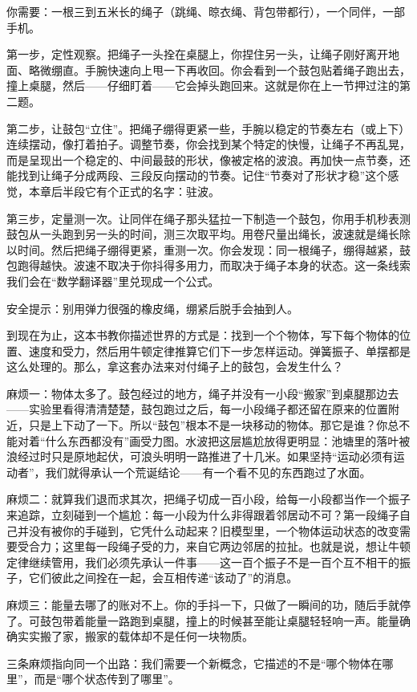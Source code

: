 \begin{experiment}[一根绳子上的波]
你需要：一根三到五米长的绳子（跳绳、晾衣绳、背包带都行），一个同伴，一部手机。

第一步，定性观察。把绳子一头拴在桌腿上，你捏住另一头，让绳子刚好离开地面、略微绷直。手腕快速向上甩一下再收回。你会看到一个鼓包贴着绳子跑出去，撞上桌腿，然后——仔细盯着——它会掉头跑回来。这就是你在上一节押过注的第二题。

第二步，让鼓包“立住”。把绳子绷得更紧一些，手腕以稳定的节奏左右（或上下）连续摆动，像打着拍子。调整节奏，你会找到某个特定的快慢，让绳子不再乱晃，而是呈现出一个稳定的、中间最鼓的形状，像被定格的波浪。再加快一点节奏，还能找到让绳子分成两段、三段反向摆动的节奏。记住“节奏对了形状才稳”这个感觉，本章后半段它有个正式的名字：驻波。

第三步，定量测一次。让同伴在绳子那头猛拉一下制造一个鼓包，你用手机秒表测鼓包从一头跑到另一头的时间，测三次取平均。用卷尺量出绳长，波速就是绳长除以时间。然后把绳子绷得更紧，重测一次。你会发现：同一根绳子，绷得越紧，鼓包跑得越快。波速不取决于你抖得多用力，而取决于绳子本身的状态。这一条线索我们会在“数学翻译器”里兑现成一个公式。

安全提示：别用弹力很强的橡皮绳，绷紧后脱手会抽到人。
\end{experiment}


\begin{mainline}
到现在为止，这本书教你描述世界的方式是：找到一个个物体，写下每个物体的位置、速度和受力，然后用牛顿定律推算它们下一步怎样运动。弹簧振子、单摆都是这么处理的。那么，拿这套办法来对付绳子上的鼓包，会发生什么？

麻烦一：物体太多了。鼓包经过的地方，绳子并没有一小段“搬家”到桌腿那边去——实验里看得清清楚楚，鼓包跑过之后，每一小段绳子都还留在原来的位置附近，只是上下动了一下。所以“鼓包”根本不是一块移动的物体。那它是谁？你总不能对着“什么东西都没有”画受力图。水波把这层尴尬放得更明显：池塘里的落叶被浪经过时只是原地起伏，可浪头明明一路推进了十几米。如果坚持“运动必须有运动者”，我们就得承认一个荒诞结论——有一个看不见的东西跑过了水面。

麻烦二：就算我们退而求其次，把绳子切成一百小段，给每一小段都当作一个振子来追踪，立刻碰到一个尴尬：每一小段为什么非得跟着邻居动不可？第一段绳子自己并没有被你的手碰到，它凭什么动起来？旧模型里，一个物体运动状态的改变需要受合力；这里每一段绳子受的力，来自它两边邻居的拉扯。也就是说，想让牛顿定律继续管用，我们必须先承认一件事——这一百个振子不是一百个互不相干的振子，它们彼此之间拴在一起，会互相传递“该动了”的消息。

麻烦三：能量去哪了的账对不上。你的手抖一下，只做了一瞬间的功，随后手就停了。可鼓包带着能量一路跑到桌腿，撞上的时候甚至能让桌腿轻轻响一声。能量确确实实搬了家，搬家的载体却不是任何一块物质。

三条麻烦指向同一个出路：我们需要一个新概念，它描述的不是“哪个物体在哪里”，而是“哪个状态传到了哪里”。
\end{mainline}

